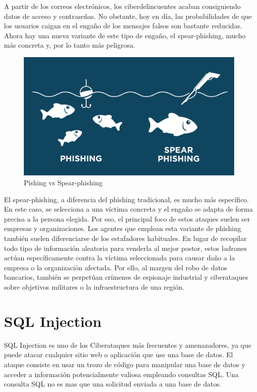 A partir de los correos electrónicos,  los ciberdelincuentes acaban consiguiendo datos de acceso y contraseñas. No obstante, hoy en día, las 
probabilidades de que los usuarios caigan en el engaño de los mensajes falsos son bastante reducidas. Ahora hay una nueva variante de este tipo de 
engaño, el spear-phishing, mucho más concreta y, por lo tanto más peligrosa.

\begin{figure}[tphb]
  		   \centering
     		   \includegraphics[width=5in]{spear-phishing.png}
  		   \caption{Pishing vs Spear-phishing \cite{armor}}
  		   \label{img:spear-pishing}
\end{figure}

El spear-phishing, a diferencia del phishing tradicional, es mucho más específico. En este caso, se selecciona a una víctima concreta y el engaño se adapta de forma precisa a la 
persona elegida. Por eso, el principal foco de estos ataques suelen ser empresas y organizaciones. Los agentes que emplean esta variante de phishing 
también suelen diferenciarse de los estafadores habituales. En lugar de recopilar todo tipo de información aleatoria para venderla al mejor postor, estos
ladrones actúan específicamente contra la víctima seleccionada para causar daño a la empresa o la organización afectada. Por ello, al margen del robo de 
datos bancarios, también se perpetúan crímenes de espionaje industrial y ciberataques sobre objetivos militares o la infraestructura de una región.

\section{SQL Injection}
\label{sec:sql-injection}

SQL Injection es uno de los Ciberataques más frecuentes y amenazadores, ya que puede atacar cualquier sitio web o aplicación que use una base de datos. 
El ataque consiste en usar un trozo de código para manipular una base de datos y acceder a información potencialmente valiosa empleando consultas SQL. 
Una consulta SQL no es mas que una solicitud enviada a una base de datos. 

